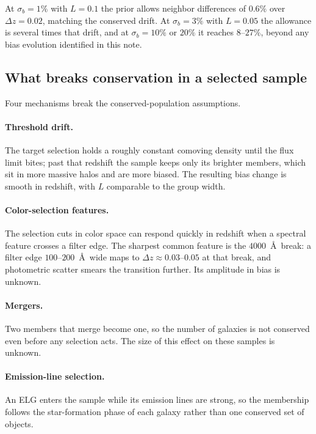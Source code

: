 \documentclass[11pt]{article}
\begin{document}
At $\sigma_b = 1\%$ with $L = 0.1$ the prior allows neighbor
differences of $0.6\%$ over $\Delta z = 0.02$, matching the conserved
drift.  At $\sigma_b = 3\%$ with $L = 0.05$ the allowance is several
times that drift, and at $\sigma_b = 10\%$ or $20\%$ it reaches
$8$--$27\%$, beyond any bias evolution identified in this note.

\subsection{What breaks conservation in a selected sample}
\label{sec:selection}

Four mechanisms break the conserved-population assumptions.

\paragraph{Threshold drift.}
The target selection holds a roughly constant comoving density until
the flux limit bites; past that redshift the sample keeps only its
brighter members, which sit in more massive halos and are more biased.
The resulting bias change is smooth in redshift, with $L$ comparable
to the group width.

\paragraph{Color-selection features.}
The selection cuts in color space can respond quickly in redshift when
a spectral feature crosses a filter edge.  The sharpest common feature
is the $4000$~\AA\ break: a filter edge $100$--$200$~\AA\ wide maps to
$\Delta z \approx 0.03$--$0.05$ at that break, and photometric
scatter smears the transition further.  Its amplitude in bias is
unknown.

\paragraph{Mergers.}
Two members that merge become one, so the number of galaxies is not
conserved even before any selection acts.  The size of this effect on
these samples is unknown.

\paragraph{Emission-line selection.}
An ELG enters the sample while its emission lines are strong, so the
membership follows the star-formation phase of each galaxy rather than
one conserved set of objects.
\end{document}
